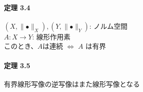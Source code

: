 \documentclass[12pt,a4paper]{article}
\begin{document}
    \paragraph{定理 3.4}
      $(X, \parallel \bullet\parallel_X), (Y, \parallel \bullet\parallel_Y)$: ノルム空間 \\
      $A : X \rightarrow Y$: 線形作用素 \\
      このとき、$A$は連続 $\Leftrightarrow$ $A$ は有界

    \paragraph{定理 3.5}
      有界線形写像の逆写像はまた線形写像となる
\end{document}

